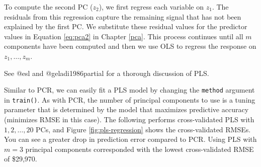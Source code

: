 \documentclass[]{krantz}
\makeatletter
\newenvironment{Shaded}{\begin{snugshade}}{\end{snugshade}}
\newcommand{\CommentTok}[1]{\textcolor[rgb]{0.37,0.37,0.37}{\textit{#1}}}
\newcommand{\DataTypeTok}[1]{\textcolor[rgb]{0.27,0.27,0.27}{#1}}
\newcommand{\DecValTok}[1]{\textcolor[rgb]{0.06,0.06,0.06}{#1}}
\newcommand{\KeywordTok}[1]{\textcolor[rgb]{0.27,0.27,0.27}{\textbf{#1}}}
\newcommand{\NormalTok}[1]{#1}
\newcommand{\OperatorTok}[1]{\textcolor[rgb]{0.43,0.43,0.43}{\textbf{#1}}}
\newcommand{\StringTok}[1]{\textcolor[rgb]{0.5,0.5,0.5}{#1}}
\newenvironment{kframe}{%
\medskip{}
\setlength{\fboxsep}{.8em}
 \def\at@end@of@kframe{}%
 \ifinner\ifhmode%
  \def\at@end@of@kframe{\end{minipage}}%
  \begin{minipage}{\columnwidth}%
 \fi\fi%
 \def\FrameCommand##1{\hskip\@totalleftmargin \hskip-\fboxsep
 \colorbox{shadecolor}{##1}\hskip-\fboxsep
     \hskip-\linewidth \hskip-\@totalleftmargin \hskip\columnwidth}%
 \MakeFramed {\advance\hsize-\width
   \@totalleftmargin\z@ \linewidth\hsize
   \@setminipage}}%
 {\par\unskip\endMakeFramed%
 \at@end@of@kframe}
\newenvironment{block}[1]
  {
  \begin{itemize}
  \renewcommand{\labelitemi}{
    \raisebox{-.7\height}[0pt][0pt]{
      {\setkeys{Gin}{width=3em,keepaspectratio}\texttt{[image: icons/\#1]}}
    }
  }
  \setlength{\fboxsep}{1em}
  \begin{kframe}
  \item
  }
  {
  \end{kframe}
  \end{itemize}
  }
\newenvironment{note}
  {\begin{block}{note}}
  {\end{block}}
\renewenvironment{Shaded}{\begin{kframe}}{\end{kframe}}
\makeatother
\begin{document}
To compute the second PC (\(z_2\)), we first regress each variable on \(z_1\). The residuals from this regression capture the remaining signal that has not been explained by the first PC. We substitute these residual values for the predictor values in Equation \eqref{eq:pca2} in Chapter \ref{pca}. This process continues until all \(m\) components have been computed and then we use OLS to regress the response on \(z_1, \dots, z_m\).

\begin{note}
See @esl and @geladi1986partial for a thorough discussion of PLS.
\end{note}

Similar to PCR, we can easily fit a PLS model by changing the \texttt{method} argument in \texttt{train()}. As with PCR, the number of principal components to use is a tuning parameter that is determined by the model that maximizes predictive accuracy (minimizes RMSE in this case). The following performs cross-validated PLS with \(1, 2, \dots, 20\) PCs, and Figure \ref{fig:pls-regression} shows the cross-validated RMSEs. You can see a greater drop in prediction error compared to PCR. Using PLS with \(m = 3\) principal components corresponded with the lowest cross-validated RMSE of \$29,970.

\begin{Shaded}
\end{Shaded}
\end{document}
